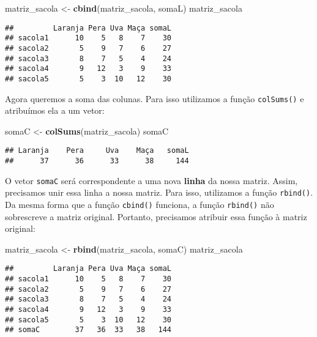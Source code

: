 \documentclass[]{book}
\newenvironment{Shaded}{\begin{snugshade}}{\end{snugshade}}
\newcommand{\KeywordTok}[1]{\textcolor[rgb]{0.13,0.29,0.53}{\textbf{#1}}}
\newcommand{\NormalTok}[1]{#1}
\newcommand{\StringTok}[1]{\textcolor[rgb]{0.31,0.60,0.02}{#1}}
\theoremstyle{definition}
\theoremstyle{definition}
\theoremstyle{definition}
\theoremstyle{remark}
\begin{document}
\begin{Shaded}
\begin{Highlighting}[]
\NormalTok{matriz_sacola <-}\StringTok{ }\KeywordTok{cbind}\NormalTok{(matriz_sacola, somaL)}
\NormalTok{matriz_sacola}
\end{Highlighting}
\end{Shaded}

\begin{verbatim}
##         Laranja Pera Uva Maça somaL
## sacola1      10    5   8    7    30
## sacola2       5    9   7    6    27
## sacola3       8    7   5    4    24
## sacola4       9   12   3    9    33
## sacola5       5    3  10   12    30
\end{verbatim}

Agora queremos a soma das colunas. Para isso utilizamos a função \texttt{colSums()} e atribuímos ela a um vetor:

\begin{Shaded}
\begin{Highlighting}[]
\NormalTok{somaC <-}\StringTok{ }\KeywordTok{colSums}\NormalTok{(matriz_sacola)}
\NormalTok{somaC}
\end{Highlighting}
\end{Shaded}

\begin{verbatim}
## Laranja    Pera     Uva    Maça   somaL 
##      37      36      33      38     144
\end{verbatim}

O vetor \texttt{somaC} será correspondente a uma nova \textbf{linha} da nossa matriz. Assim, precisamos unir essa linha a nossa matriz. Para isso, utilizamos a função \texttt{rbind()}. Da mesma forma que a função \texttt{cbind()} funciona, a função \texttt{rbind()} não sobrescreve a matriz original. Portanto, precisamos atribuir essa função à matriz original:

\begin{Shaded}
\begin{Highlighting}[]
\NormalTok{matriz_sacola <-}\StringTok{ }\KeywordTok{rbind}\NormalTok{(matriz_sacola, somaC)}
\NormalTok{matriz_sacola}
\end{Highlighting}
\end{Shaded}

\begin{verbatim}
##         Laranja Pera Uva Maça somaL
## sacola1      10    5   8    7    30
## sacola2       5    9   7    6    27
## sacola3       8    7   5    4    24
## sacola4       9   12   3    9    33
## sacola5       5    3  10   12    30
## somaC        37   36  33   38   144
\end{verbatim}
\end{document}
